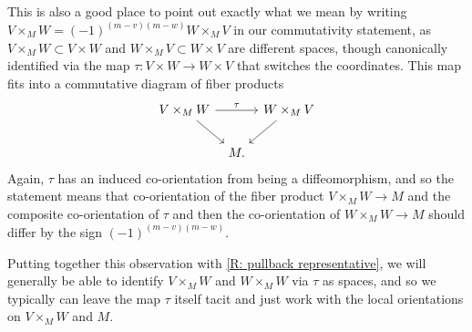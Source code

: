 \begin{remark}\label{R: precise commutativity}
	This is also a good place to point out exactly what we mean by writing $V \times_M W = (-1)^{(m-v)(m-w)}W \times_M V$ in our commutativity statement, as $V \times_M W \subset V \times W$ and $W \times_M V \subset W \times V$ are different spaces, though canonically identified via the map $\tau \colon V \times W \to W \times V$ that switches the coordinates.
	This map fits into a commutative diagram of fiber products
	\[
	\begin{tikzcd}[column sep=tiny]
		V \times_M W \arrow[rr, "\tau"] \arrow[dr] & & W \times_M V \arrow[dl] \\
		& M. &
	\end{tikzcd}
	\]
	Again, $\tau$ has an induced co-orientation from being a diffeomorphism, and so the statement means that co-orientation of the fiber product $V \times_M W \to M$ and the composite co-orientation of $\tau$ and then the co-orientation of $W \times_M W \to M$ should differ by the sign $(-1)^{(m-v)(m-w)}$.

	Putting together this observation with \cref{R: pullback representative}, we will generally be able to identify $V \times_M W$ and $W \times_M W$ via $\tau$ as spaces, and so we typically can leave the map $\tau$ itself tacit and just work with the local orientations on $V \times_M W$ and $M$.
\end{remark}

